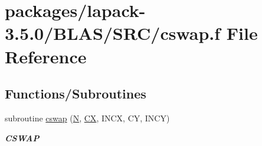 \hypertarget{lapack-3_85_80_2BLAS_2SRC_2cswap_8f}{}\section{packages/lapack-\/3.5.0/\+B\+L\+A\+S/\+S\+R\+C/cswap.f File Reference}
\label{lapack-3_85_80_2BLAS_2SRC_2cswap_8f}
\subsection*{Functions/\+Subroutines}
\begin{DoxyCompactItemize}
\item 
subroutine \hyperlink{group__complex__blas__level1_gaa50b533bbd2eceac1f59dbc780d7a182}{cswap} (\hyperlink{polmisc_8c_a0240ac851181b84ac374872dc5434ee4}{N}, \hyperlink{scsum1_8c_a5a76da95c549c41790389a76e12fdcb5}{C\+X}, I\+N\+C\+X, C\+Y, I\+N\+C\+Y)
\begin{DoxyCompactList}\small\item\em {\bfseries C\+S\+W\+A\+P} \end{DoxyCompactList}\end{DoxyCompactItemize}
